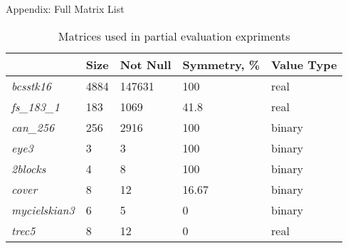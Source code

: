 \documentclass{beamer}
\begin{document}
\begin{frame}{Appendix: Full Matrix List}
	\begin{table}
		\begin{tabular}{|l|l|l|l|l|}
			\hline
			& Size & Not Null & Symmetry, \% & Value Type \\ \hline
			\textit{bcsstk16}   & 4884 & 147631  & 100          & real   \\ \hline
			\textit{fs\_183\_1} & 183  & 1069    & 41.8         & real   \\ \hline
			\textit{can\_256}   & 256  & 2916    & 100          & binary \\ \hline
			\textit{eye3}       & 3    & 3       & 100          & binary \\ \hline
			\textit{2blocks}    & 4    & 8       & 100          & binary \\ \hline
			\textit{cover}      & 8    & 12      & 16.67        & binary \\ \hline
			\textit{mycielskian3}        & 6    & 5       & 0            & binary \\ \hline
			\textit{trec5}               & 8    & 12      & 0            & real   \\ \hline
		\end{tabular} \bigskip
		\centering
		\caption{Matrices used in partial evaluation expriments}
	\end{table}
	
\end{frame}
\end{document}

